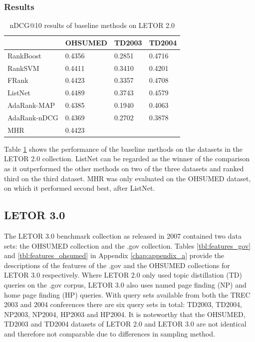 \subsubsection{Results}
\begin{table}[!h]
\begin{tabular}{l|lll}
 & OHSUMED & TD2003 & TD2004 \\
 \hline 
RankBoost & 0.4356 & 0.2851 & 0.4716 \\ 
Rank\acs{SVM} & 0.4411 & 0.3410 & 0.4201 \\ 
FRank & 0.4423 & 0.3357 & 0.4708 \\ 
ListNet & 0.4489 & 0.3743 & 0.4579 \\ 
AdaRank-\acs{MAP} & 0.4385 & 0.1940 & 0.4063 \\ 
AdaRank-\acs{nDCG} & 0.4369 & 0.2702 & 0.3878 \\ 
\acs{MHR} & 0.4423 &  &  \\ 
\end{tabular}
\caption{\acs{nDCG}@10 results of baseline methods on LETOR 2.0}
\label{tab:letor2.0_results}
\end{table}
Table \ref{tab:letor2.0_results} shows the performance of the baseline methods on the datasets in the LETOR 2.0 collection. ListNet can be regarded as the winner of the comparison as it outperformed the other methods on two of the three datasets and ranked third on the third dataset. \acs{MHR} was only evaluated on the OHSUMED dataset, on which it performed second best, after ListNet.


\subsection{LETOR 3.0}
The LETOR 3.0 benchmark collection \cite{Qin2010} as released in 2007 contained two data sets: the OHSUMED collection and the .gov collection. Tables \ref{tbl:features_gov} and \ref{tbl:features_ohsumed} in Appendix \ref{chap:appendix_a} provide the descriptions of the features of the .gov and the OHSUMED collections for LETOR 3.0 respectively. Where LETOR 2.0 only used topic distillation (TD) queries on the .gov corpus, LETOR 3.0 also uses named page finding (NP) and home page finding (HP) queries. With query sets available from both the \ac{TREC} 2003 and 2004 conferences there are six query sets in total: TD2003, TD2004, NP2003, NP2004, HP2003 and HP2004. It is noteworthy that the OHSUMED, TD2003 and TD2004 datasets of LETOR 2.0 and LETOR 3.0 are not identical and therefore not comparable due to differences in sampling method.\\

